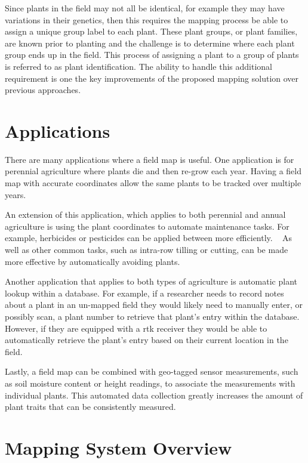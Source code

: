 Since plants in the field may not all be identical, for example they may have variations in their genetics, then this requires the mapping process be able to assign a unique group label to each plant.  These plant groups, or plant families, are known prior to planting and the challenge is to determine where each plant group ends up in the field.  This process of assigning a plant to a group of plants is referred to as plant identification. The ability to handle this additional requirement is one the key improvements of the proposed mapping solution over previous approaches.

\section{Applications}

There are many applications where a field map is useful.  One application is for perennial agriculture where plants die and then re-grow each year.  Having a field map with accurate coordinates allow the same plants to be tracked over multiple years.

An extension of this application, which applies to both perennial and annual agriculture is using the plant coordinates to automate maintenance tasks.  For example, herbicides or pesticides can be applied between more efficiently. ~\citep{Carballido:2013} As well as other common tasks, such as intra-row tilling or cutting, can be made more effective by automatically avoiding plants. ~\citep{Bakker:2010}  

Another application that applies to both types of agriculture is automatic plant lookup within a database.  For example, if a researcher needs to record notes about a plant in an un-mapped field they would likely need to manually enter, or possibly scan, a plant number to retrieve that plant's entry within the database.  However, if they are equipped with a \ac{rtk} receiver they would be able to automatically retrieve the plant's entry based on their current location in the field. 

Lastly, a field map can be combined with geo-tagged sensor measurements, such as soil moisture content or height readings, to associate the measurements with individual plants.  This automated data collection greatly increases the amount of plant traits that can be consistently measured. ~\citep{Ruckelshausen:2009}

\section{Mapping System Overview} 

